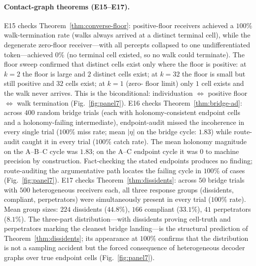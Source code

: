 \documentclass[twocolumn,11pt,a4paper]{article}
\theoremstyle{adv}
\theoremstyle{definition}
\theoremstyle{remark}
\begin{document}
\paragraph{Contact-graph theorems (E15--E17).}
E15 checks Theorem~\ref{thm:converse-floor}: positive-floor receivers
achieved a $100\%$ walk-termination rate (walks always arrived at a
distinct terminal cell), while the degenerate zero-floor receiver---with
all percepts collapsed to one undifferentiated token---achieved $0\%$
(no terminal cell existed, so no walk could terminate). The floor sweep
confirmed that distinct cells exist only where the floor is positive:
at $k=2$ the floor is large and $2$ distinct cells exist; at $k=32$ the
floor is small but still positive and $32$ cells exist; at $k=1$ (zero-
floor limit) only $1$ cell exists and the walk never arrives. This is the
biconditional: individuation $\iff$ positive floor $\iff$ walk termination
(Fig.~\ref{fig:panel7}).
E16 checks Theorem~\ref{thm:bridge-ad}: across $400$ random bridge trials
(each with holonomy-consistent endpoint cells and a holonomy-failing
intermediate), endpoint-audit missed the incoherence in every single trial
($100\%$ miss rate; mean $|\eta|$ on the bridge cycle: $1.83$) while
route-audit caught it in every trial ($100\%$ catch rate). The mean
holonomy magnitude on the A--B--C cycle was $1.83$; on the A--C endpoint
cycle it was $0$ to machine precision by construction. Fact-checking the
stated endpoints produces no finding; route-auditing the argumentative path
locates the failing cycle in $100\%$ of cases (Fig.~\ref{fig:panel7}).
E17 checks Theorem~\ref{thm:dissidents}: across $50$ bridge trials with
$500$ heterogeneous receivers each, all three response groups (dissidents,
compliant, perpetrators) were simultaneously present in every trial
($100\%$ rate). Mean group sizes: $224$ dissidents ($44.8\%$), $166$
compliant ($33.1\%$), $41$ perpetrators ($8.1\%$). The three-part
distribution---with dissidents proving cell-truth and perpetrators marking
the cleanest bridge landing---is the structural prediction of
Theorem~\ref{thm:dissidents}; its appearance at $100\%$ confirms that
the distribution is not a sampling accident but the forced consequence of
heterogeneous decoder graphs over true endpoint cells
(Fig.~\ref{fig:panel7}).
\end{document}

